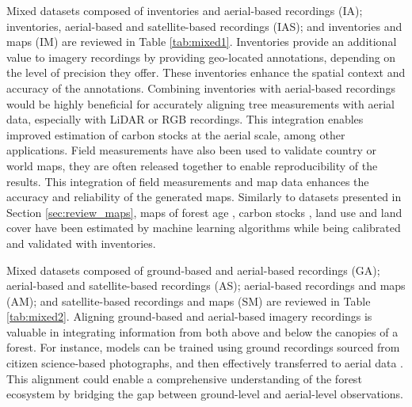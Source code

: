 \documentclass{CUP-JNL-DTM}%
\theoremstyle{definition}
\numberwithin{equation}{section}
\begin{document}
Mixed datasets composed of inventories and aerial-based recordings (IA); inventories, aerial-based and satellite-based recordings (IAS); and inventories and maps (IM) are reviewed in Table \ref{tab:mixed1}.
%
Inventories provide an additional value to imagery recordings by providing geo-located annotations, depending on the level of precision they offer.
These inventories enhance the spatial context and accuracy of the annotations.
Combining inventories with aerial-based recordings would be highly beneficial for accurately aligning tree measurements with aerial data, especially with LiDAR \cite{weiser_individual_2022} or RGB \cite{brieger_advances_2019, van_geffen_sidroforest_2022} recordings. This integration enables improved estimation of carbon stocks at the aerial scale, among other applications.
%
Field measurements have also been used to validate country or world maps, they are often released together to enable reproducibility of the results.
This integration of field measurements and map data enhances the accuracy and reliability of the generated maps.
Similarly to datasets presented in Section \ref{sec:review_maps}, maps of 
forest age \cite{besnard_mapping_2021}, carbon stocks \cite{tucker_sub-continental-scale_2023}, land use and land cover \cite{koskinen_participatory_2019, bendini_combining_2020, bendini_combining_2020, shevtsova_strong_2020, european_commission_statistical_office_of_the_european_union_lucas_2021} have been estimated by machine learning algorithms while being calibrated and validated with inventories.




Mixed datasets composed of ground-based and aerial-based recordings (GA); aerial-based and satellite-based recordings (AS); aerial-based recordings and maps (AM); and satellite-based recordings and maps (SM) are reviewed in Table \ref{tab:mixed2}.
%
Aligning ground-based and aerial-based imagery recordings is valuable in integrating information from both above and below the canopies of a forest. For instance, models can be trained using ground recordings sourced from citizen science-based photographs, and then effectively transferred to aerial data \cite{soltani_transfer_2022}. 
This alignment could enable a comprehensive understanding of the forest ecosystem by bridging the gap between ground-level and aerial-level observations.
%
\end{document}
